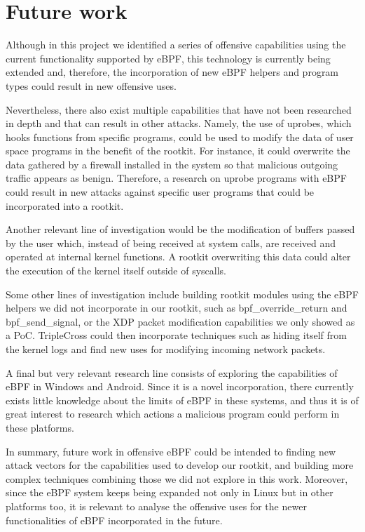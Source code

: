 \section{Future work}
Although in this project we identified a series of offensive capabilities using the current functionality supported by eBPF, this technology is currently being extended and, therefore, the incorporation of new eBPF helpers and program types could result in new offensive uses.

Nevertheless, there also exist multiple capabilities that have not been researched in depth and that can result in other attacks. Namely, the use of uprobes, which hooks functions from specific programs, could be used to modify the data of user space programs in the benefit of the rootkit. For instance, it could overwrite the data gathered by a firewall installed in the system so that malicious outgoing traffic appears as benign. Therefore, a research on uprobe programs with eBPF could result in new attacks against specific user programs that could be incorporated into a rootkit.

Another relevant line of investigation would be the modification of buffers passed by the user which, instead of being received at system calls, are received and operated at internal kernel functions. A rootkit overwriting this data could alter the execution of the kernel itself outside of syscalls. 

Some other lines of investigation include building rootkit modules using the eBPF helpers we did not incorporate in our rootkit, such as bpf\_override\_return and  bpf\_send\_signal, or the XDP packet modification capabilities we only showed as a PoC. TripleCross could then incorporate techniques such as hiding itself from the kernel logs and find new uses for modifying incoming network packets.

A final but very relevant research line consists of exploring the capabilities of eBPF in Windows and Android. Since it is a novel incorporation, there currently exists little knowledge about the limits of eBPF in these systems, and thus it is of great interest to research which actions a malicious program could perform in these platforms.

In summary, future work in offensive eBPF could be intended to finding new attack vectors for the capabilities used to develop our rootkit, and building more complex techniques combining those we did not explore in this work. Moreover, since the eBPF system keeps being expanded not only in Linux but in other platforms too, it is relevant to analyse the offensive uses for the newer functionalities of eBPF incorporated in the future.